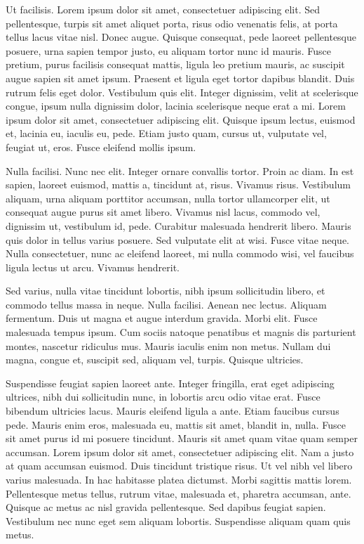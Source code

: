 \documentclass{article}
\begin{document}
Ut facilisis. Lorem ipsum dolor sit amet, consectetuer adipiscing elit. Sed
pellentesque, turpis sit amet aliquet porta, risus odio venenatis felis, at
porta tellus lacus vitae nisl. Donec augue. Quisque consequat, pede laoreet
pellentesque posuere, urna sapien tempor justo, eu aliquam tortor nunc id
mauris. Fusce pretium, purus facilisis consequat mattis, ligula leo pretium
mauris, ac suscipit augue sapien sit amet ipsum. Praesent et ligula eget tortor
dapibus blandit. Duis rutrum felis eget dolor. Vestibulum quis elit. Integer
dignissim, velit at scelerisque congue, ipsum nulla dignissim dolor, lacinia
scelerisque neque erat a
mi. Lorem ipsum dolor sit amet, consectetuer adipiscing elit. Quisque ipsum
lectus, euismod et, lacinia eu, iaculis eu, pede. Etiam justo quam, cursus ut,
vulputate vel, feugiat ut, eros. Fusce eleifend mollis ipsum.

Nulla facilisi. Nunc nec elit. Integer ornare convallis tortor. Proin ac
diam. In est sapien, laoreet euismod, mattis a, tincidunt at, risus. Vivamus
risus. Vestibulum aliquam, urna aliquam porttitor accumsan, nulla tortor
ullamcorper elit, ut consequat augue purus sit amet libero. Vivamus nisl lacus,
commodo vel, dignissim ut, vestibulum id, pede. Curabitur malesuada hendrerit
libero. Mauris quis dolor in tellus varius posuere. Sed vulputate elit at wisi.
Fusce vitae neque. Nulla consectetuer, nunc ac eleifend laoreet, mi nulla
commodo wisi, vel faucibus ligula lectus ut arcu. Vivamus hendrerit.

Sed varius, nulla vitae tincidunt lobortis, nibh ipsum sollicitudin libero,
et commodo tellus massa in neque. Nulla facilisi. Aenean nec lectus. Aliquam
fermentum. Duis ut magna et augue interdum gravida. Morbi elit. Fusce malesuada
tempus ipsum. Cum sociis natoque penatibus et magnis dis parturient montes,
nascetur ridiculus mus. Mauris iaculis enim non metus. Nullam dui magna, congue
et, suscipit sed, aliquam vel, turpis. Quisque ultricies.

Suspendisse feugiat sapien laoreet ante. Integer fringilla, erat eget
adipiscing ultrices, nibh dui sollicitudin nunc, in lobortis arcu odio vitae
erat. Fusce bibendum ultricies lacus. Mauris eleifend ligula a ante. Etiam
faucibus cursus pede. Mauris enim eros, malesuada eu, mattis sit amet, blandit
in, nulla. Fusce sit amet purus id mi posuere tincidunt. Mauris sit amet quam
vitae quam semper accumsan. Lorem ipsum dolor sit amet, consectetuer adipiscing
elit. Nam a justo at quam accumsan euismod. Duis tincidunt tristique risus. Ut
vel nibh vel libero varius malesuada. In hac habitasse platea dictumst. Morbi
sagittis mattis lorem. Pellentesque metus tellus, rutrum vitae, malesuada et,
pharetra accumsan, ante. Quisque ac metus ac nisl gravida pellentesque. Sed
dapibus feugiat sapien. Vestibulum nec nunc eget sem aliquam lobortis.
Suspendisse aliquam quam quis metus.
\end{document}
